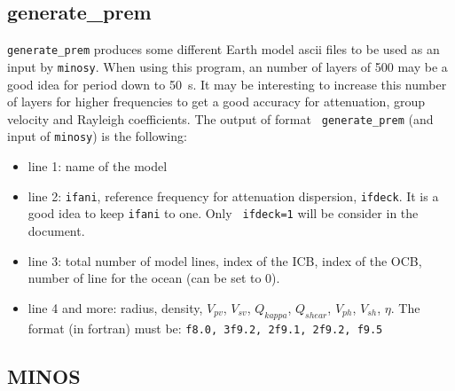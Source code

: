 \documentclass[11pt]{article}
\begin{document}
\subsection{generate\_prem}
{\tt generate\_prem} produces some different Earth model ascii files
to be used as an input by {\tt minosy}. When using this program, 
an number of layers of 500 may be a good idea for period down to 50~s.
It may be interesting to increase this number of layers for higher
frequencies to get a good accuracy for attenuation, group velocity and
Rayleigh coefficients.
The output of format {\tt
generate\_prem} (and input of {\tt minosy}) is the following:
\begin{itemize}	
\item line 1: name of the model
\item line 2: {\tt ifani}, reference frequency for attenuation
dispersion, {\tt ifdeck}. It is a good idea to keep {\tt ifani} to
one. Only {\tt 
ifdeck=1} will be consider in the document.
\item line 3: total number of model lines, index of the ICB, index of
the OCB, number of line for the ocean (can be set to 0).
\item line 4 and more:
radius, density, $V_{pv}$, $V_{sv}$, $Q_{kappa}$, $Q_{shear}$, 
$V_{ph}$,  $V_{sh}$, $\eta$.
The format (in fortran) must be: {\tt f8.0, 3f9.2, 2f9.1, 2f9.2, f9.5}

\end{itemize}	

\subsection{MINOS}
\end{document}
